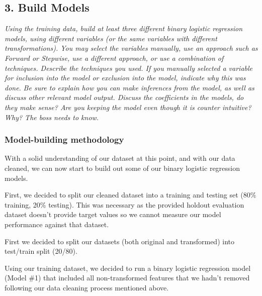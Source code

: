 \documentclass[
]{article}
\begin{document}
\hypertarget{build-models}{%
\subsection{3. Build Models}\label{build-models}}

\emph{Using the training data, build at least three different binary
logistic regression models, using different variables (or the same
variables with different transformations). You may select the variables
manually, use an approach such as Forward or Stepwise, use a different
approach, or use a combination of techniques. Describe the techniques
you used. If you manually selected a variable for inclusion into the
model or exclusion into the model, indicate why this was done.} \emph{Be
sure to explain how you can make inferences from the model, as well as
discuss other relevant model output. Discuss the coefficients in the
models, do they make sense? Are you keeping the model even though it is
counter intuitive? Why? The boss needs to know.}

\hypertarget{model-building-methodology}{%
\subsubsection{Model-building
methodology}\label{model-building-methodology}}

With a solid understanding of our dataset at this point, and with our
data cleaned, we can now start to build out some of our binary logistic
regression models.

First, we decided to split our cleaned dataset into a training and
testing set (80\% training, 20\% testing). This was necessary as the
provided holdout evaluation dataset doesn't provide target values so we
cannot measure our model performance against that dataset.

First we decided to split our datasets (both original and transformed)
into test/train split (20/80).

Using our training dataset, we decided to run a binary logistic
regression model (Model \#1) that included all non-transformed features
that we hadn't removed following our data cleaning process mentioned
above.
\end{document}
